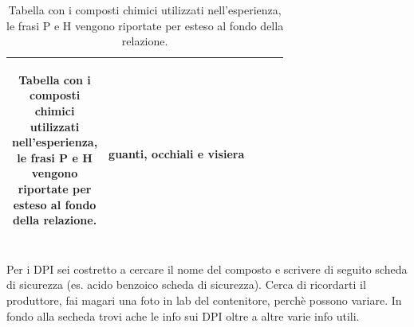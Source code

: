 \begin{table}[!ht]
\begin{tabularx}{1\textwidth}{m{}|m{}|m{}|m{}|m{}}
\begin{center}
\begin{tabular}{cc}
             \end{tabular}\end{center} & guanti, occhiali e visiera\\
    \bottomrule
    \end{tabularx}
    \caption{Tabella con i composti chimici utilizzati nell'esperienza, le frasi P e H vengono riportate per esteso al fondo della relazione.}
    \label{tab:tab1}
    \normalsize
\end{table}





Per i DPI sei costretto a cercare il nome del composto e scrivere di seguito scheda di sicurezza (es. acido benzoico scheda di sicurezza). Cerca di ricordarti il produttore, fai magari una foto in lab del contenitore, perchè possono variare. In fondo alla secheda trovi ache le info sui DPI oltre a altre varie info utili.

